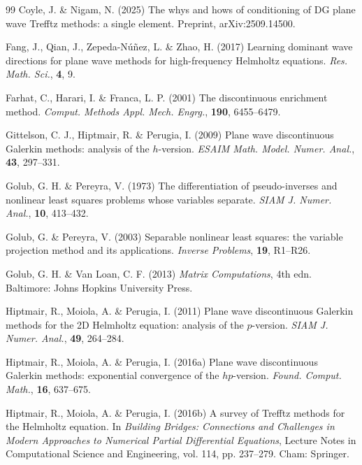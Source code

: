 \documentclass[11pt]{article}
\numberwithin{equation}{section}
\begin{document}
\begin{thebibliography}{99}
Coyle, J. \& Nigam, N. (2025) The whys and hows of conditioning of DG plane wave Trefftz methods: a single element. Preprint, arXiv:2509.14500.

Fang, J., Qian, J., Zepeda-N\'u\~nez, L. \& Zhao, H. (2017) Learning dominant wave directions for plane wave methods for high-frequency Helmholtz equations. \emph{Res. Math. Sci.}, \textbf{4}, 9.

Farhat, C., Harari, I. \& Franca, L. P. (2001) The discontinuous enrichment method. \emph{Comput. Methods Appl. Mech. Engrg.}, \textbf{190}, 6455--6479.

Gittelson, C. J., Hiptmair, R. \& Perugia, I. (2009) Plane wave discontinuous Galerkin methods: analysis of the $h$-version. \emph{ESAIM Math. Model. Numer. Anal.}, \textbf{43}, 297--331.

Golub, G. H. \& Pereyra, V. (1973) The differentiation of pseudo-inverses and nonlinear least squares problems whose variables separate. \emph{SIAM J. Numer. Anal.}, \textbf{10}, 413--432.

Golub, G. \& Pereyra, V. (2003) Separable nonlinear least squares: the variable projection method and its applications. \emph{Inverse Problems}, \textbf{19}, R1--R26.

Golub, G. H. \& Van Loan, C. F. (2013) \emph{Matrix Computations}, 4th edn. Baltimore: Johns Hopkins University Press.

Hiptmair, R., Moiola, A. \& Perugia, I. (2011) Plane wave discontinuous Galerkin methods for the 2D Helmholtz equation: analysis of the $p$-version. \emph{SIAM J. Numer. Anal.}, \textbf{49}, 264--284.

Hiptmair, R., Moiola, A. \& Perugia, I. (2016a) Plane wave discontinuous Galerkin methods: exponential convergence of the $hp$-version. \emph{Found. Comput. Math.}, \textbf{16}, 637--675.

Hiptmair, R., Moiola, A. \& Perugia, I. (2016b) A survey of Trefftz methods for the Helmholtz equation. In \emph{Building Bridges: Connections and Challenges in Modern Approaches to Numerical Partial Differential Equations}, Lecture Notes in Computational Science and Engineering, vol. 114, pp. 237--279. Cham: Springer.


\end{thebibliography}
\end{document}

